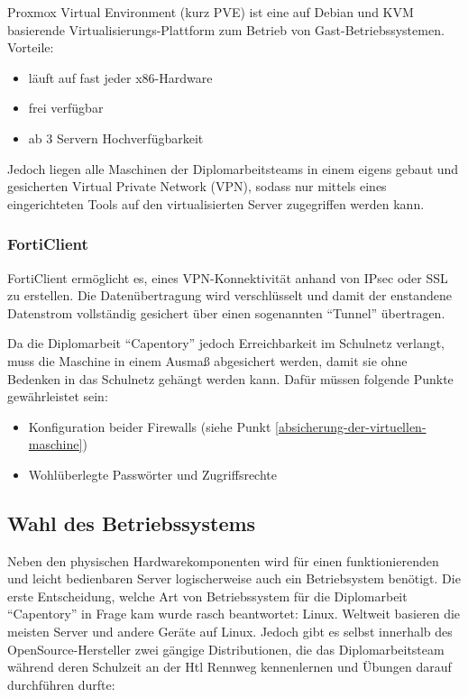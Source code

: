 Proxmox Virtual Environment (kurz PVE) ist eine auf Debian und KVM
basierende Virtualisierungs-Plattform zum Betrieb von
Gast-Betriebssystemen. Vorteile:

\begin{itemize}
\tightlist
\item
  läuft auf fast jeder x86-Hardware
\item
  frei verfügbar
\item
  ab 3 Servern Hochverfügbarkeit
\end{itemize}

Jedoch liegen alle Maschinen der Diplomarbeitsteams in einem eigens
gebaut und gesicherten Virtual Private Network (VPN), sodass nur mittels
eines eingerichteten Tools auf den virtualisierten Server zugegriffen
werden kann.

\hypertarget{forticlient}{%
\subsubsection{FortiClient}\label{forticlient}}

FortiClient ermöglicht es, eines VPN-Konnektivität anhand von IPsec oder
SSL zu erstellen. Die Datenübertragung wird verschlüsselt und damit der
enstandene Datenstrom vollständig gesichert über einen sogenannten
``Tunnel'' übertragen.

Da die Diplomarbeit ``Capentory'' jedoch Erreichbarkeit im Schulnetz
verlangt, muss die Maschine in einem Ausmaß abgesichert werden, damit
sie ohne Bedenken in das Schulnetz gehängt werden kann. Dafür müssen
folgende Punkte gewährleistet sein:

\begin{itemize}
\tightlist
\item
  Konfiguration beider Firewalls (siehe Punkt
  \ref{absicherung-der-virtuellen-maschine})
\item
  Wohlüberlegte Passwörter und Zugriffsrechte
\end{itemize}

\hypertarget{wahl-des-betriebssystems}{%
\subsection{Wahl des Betriebssystems}\label{wahl-des-betriebssystems}}

Neben den physischen Hardwarekomponenten wird für einen funktionierenden
und leicht bedienbaren Server logischerweise auch ein Betriebsystem
benötigt. Die erste Entscheidung, welche Art von Betriebssystem für die
Diplomarbeit ``Capentory'' in Frage kam wurde rasch beantwortet: Linux.
Weltweit basieren die meisten Server und andere Geräte auf Linux. Jedoch
gibt es selbst innerhalb des OpenSource-Hersteller zwei gängige
Distributionen, die das Diplomarbeitsteam während deren Schulzeit an der
Htl Rennweg kennenlernen und Übungen darauf durchführen durfte:

